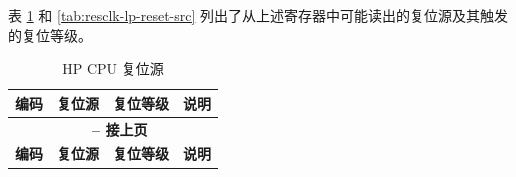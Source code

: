 \documentclass[main\_\_CN.tex]{subfiles}
\begin{document}
表 \ref{tab:resclk-hp-reset-src} 和 \ref{tab:resclk-lp-reset-src} 列出了从上述寄存器中可能读出的复位源及其触发的复位等级。



\begin{longtable}[c]{ |l|m{3.5cm}|m{2.7cm}|m{8.7cm}| }
    \caption{HP CPU 复位源}
    \label{tab:resclk-hp-reset-src}\\\hline

    \rowcolor{lightgray}
    \textbf{编码} & \textbf{复位源} & \textbf{复位等级} &   \textbf{说明} \\\hline
    \endfirsthead


    \multicolumn{4}{c}{\bfseries \tablename\ \thetable{} -- 接上页}\\\hline
    \rowcolor{lightgray}
    \textbf{编码} & \textbf{复位源} & \textbf{复位等级} &   \textbf{说明} \\\hline
    \endhead


\end{longtable}
\end{document}
